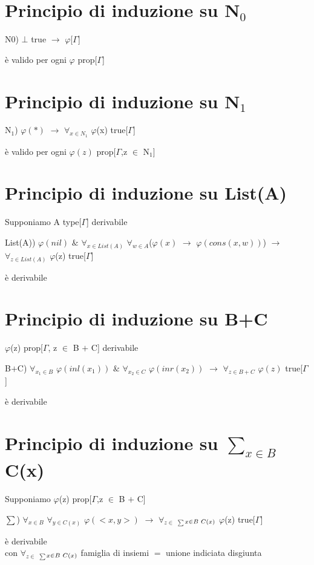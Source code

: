 \section{Principio di induzione su N$_0$}
\label{sec:principio-di-induzione-N0}
\begin{center}N$0$) $\bot$ true $\rightarrow$ $\varphi$[$\Gamma$]\end{center} \`e valido per ogni $\varphi$ prop[$\Gamma$]
\section{Principio di induzione su N$_1$}
\label{sec:principio-di-induzione-N1}
\begin{center}N$_1$) $\varphi(\ast)$ $\rightarrow$ $\forall_{x \in N_1}$ $\varphi$(x) true[$\Gamma$] \end{center}\`e valido per ogni $\varphi(z)$ prop[$\Gamma$,z $\in$ N$_1$]

\section{Principio di induzione su List(A)}
\label{sec:principio-di-induzione-List(A)}
Supponiamo A type[$\Gamma$] derivabile \\
\begin{center}List(A)) $\varphi(nil)$ $\&$ $\forall_{x \in List(A)}$ $\forall_{w \in A}$($\varphi(x)$ $\rightarrow$ $\varphi(cons(x,w))$) $\rightarrow$ $\forall_{z \in List(A)}$ $\varphi$(z) true[$\Gamma$]\end{center} \`e derivabile\\

\section{Principio di induzione su B+C}
\label{sec:principio-di-induzione-B+C}
$\varphi$(z) prop[$\Gamma$, z $\in$ B $+$ C] derivabile
\noindent
\begin{center}B$+$C) $\forall_{x_1 \in B}$  $\varphi(inl(x_1))$ $\&$ $\forall_{x_2 \in C}$  $\varphi(inr(x_2))$ $\rightarrow$ $\forall_{z\in B+C}$  $\varphi(z)$ true[$\Gamma$]\end{center} \`e derivabile
\section{Principio di induzione su $\sum\limits_{x \in B}$ C(x)}
\label{sec:principio-di-induzione-sum}
Supponiamo $\varphi$(z) prop[$\Gamma$,z $\in$ B $+$ C]
\begin{center}{\scriptsize $\sum$}) $\forall_{x \in B}$ $\forall_{y \in C(x)}$ $\varphi(<x,y>)$ $\rightarrow$ $\forall_{z \in}$ {\scriptsize$_{\sum}$}$_{x \in B \hspace{0.1cm}C(x)}$ $\varphi$(z) true[$\Gamma$]\end{center} \`e derivabile\\
con $\forall_{z \in}$ {\scriptsize$_{\sum}$}$_{x \in B \hspace{0.1cm}C(x)}$ famiglia di insiemi $=$ unione indiciata disgiunta\\

